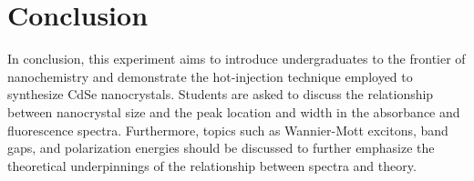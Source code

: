 \documentclass[journal = jceda8, manuscript = article]{achemso}
\begin{document}
\section{Conclusion}


In conclusion, this experiment aims to introduce undergraduates to the frontier
of nanochemistry and demonstrate the hot-injection technique employed to
synthesize CdSe nanocrystals. Students are asked to discuss the relationship
between nanocrystal size and the peak location and width in the absorbance and
fluorescence spectra. Furthermore, topics such as Wannier-Mott excitons, band
gaps, and polarization energies should be discussed to further emphasize the
theoretical underpinnings of the relationship between spectra and theory.

\newpage


\end{document}
